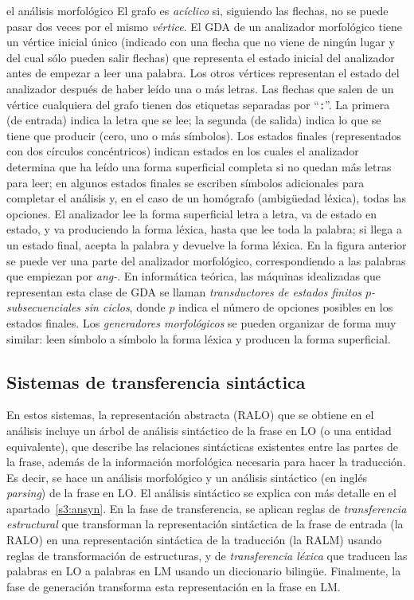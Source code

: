 \begin{persabermes}{el análisis morfológico}
El grafo es \emph{acíclico} si, siguiendo las flechas, no se puede pasar dos veces por el mismo \emph{vértice}. El GDA de un analizador morfológico tiene un vértice inicial único (indicado con una flecha que no viene de ningún lugar y del cual sólo pueden salir flechas) que representa el estado inicial del analizador antes de empezar a leer una palabra. Los otros vértices representan el estado del analizador después de haber leído una o más letras. Las flechas que salen de un vértice cualquiera del grafo tienen dos etiquetas separadas por ``{\tt :}''. La primera (de entrada) indica la letra que se lee; la segunda (de salida) indica lo que se tiene que producir (cero, uno o más símbolos). Los estados finales (representados con dos círculos concéntricos) indican estados en los cuales el analizador determina que ha leído una forma superficial completa si no quedan más letras para leer; en algunos estados finales se escriben símbolos adicionales para completar el análisis y, en el caso de un homógrafo (ambigüedad léxica), todas las opciones. El analizador lee la forma superficial letra a letra, va de estado en estado, y va produciendo la forma léxica, hasta que lee toda la palabra; si llega a un estado final, acepta la palabra y  devuelve la forma léxica. En la figura anterior se puede ver una parte del analizador morfológico, correspondiendo a las palabras que empiezan por \emph{ang-}. En informática teórica, las máquinas idealizadas que representan esta clase de GDA se llaman \emph{transductores de estados finitos $p$-subsecuenciales sin ciclos}, donde $p$ indica el número de opciones posibles en los estados finales. Los \emph{generadores morfológicos} se pueden organizar de forma muy similar: leen símbolo a símbolo la forma léxica y producen la forma superficial. \end{persabermes} 

\subsection{Sistemas de transferencia sintáctica} \label{s3:transyn} 

En estos sistemas, la representación abstracta (RALO) que se obtiene en el análisis incluye un árbol de análisis sintáctico de la frase en LO (o una entidad equivalente), que describe las relaciones sintácticas existentes entre las partes de la frase, además de la información morfológica necesaria para hacer la traducción. Es decir, se hace un análisis morfológico y un análisis sintáctico (en inglés \emph{parsing}) de la frase en LO. El análisis sintáctico se explica con más detalle en el apartado~\ref{s3:ansyn}. En la fase de transferencia, se aplican reglas de \emph{transferencia estructural} que transforman la representación sintáctica de la frase de entrada (la RALO) en una representación sintáctica de la traducción (la RALM) usando reglas de transformación de estructuras, y de \emph{transferencia léxica} que traducen las palabras en LO a palabras en LM usando un diccionario bilingüe. Finalmente, la fase de generación transforma esta representación en la frase en LM. 

